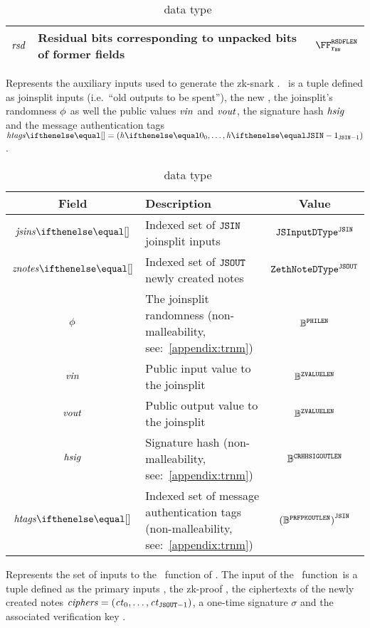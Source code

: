 \begin{description}
\begin{table}[H]
\begin{tabular}{cp{20em}c}
            $\mathit{rsd}$ & Residual bits corresponding to unpacked bits of former fields& $\FFx{\rBN}^{\resBitsFLen}$\\ \bottomrule
        \end{tabular}
        \caption{\primInputDType~data type}\label{zeth-protocol:tab:priminputs}
        \end{table}
    \item[\auxInputDType] Represents the auxiliary inputs used to generate the zk-snark \zkp. \auxinputs~is a tuple defined as \gls{joinsplit} inputs (i.e.~``old outputs to be spent''), the new \zethnotes{}, the joinsplit's randomness $\mathit{\phi}$ as well the public values $\mathit{vin}$ and $\mathit{vout}$, the signature hash $\mathit{hsig}$ and the message authentication tags $\htags{} = \smalltuple{\htag{0}, \ldots, \htag{\jsin-1}}$.
        \begin{table}[H]
        \centering
        \begin{tabular}{cp{20em}c}
            Field & Description & Value\\ \toprule
            $\jsins{}$ & Indexed set of $\mathtt{JSIN}$ \gls{joinsplit} inputs & ${\mathtt{JSInputDType}}^{\mathtt{JSIN}}$\\ \midrule
            $\znotes{}$ & Indexed set of $\mathtt{JSOUT}$ newly created notes & ${\mathtt{ZethNoteDType}}^{\mathtt{JSOUT}}$\\ \midrule
            $\mathit{\phi}$ & The \gls{joinsplit} randomness (non-malleability, see:~\cref{appendix:trnm}) & $\mathbb{B}^{\mathtt{PHILEN}}$\\ \midrule
            $\mathit{vin}$ & Public input value to the \gls{joinsplit} & $\mathbb{B}^{\mathtt{ZVALUELEN}}$\\ \midrule
            $\mathit{vout}$ & Public output value to the \gls{joinsplit} & $\mathbb{B}^{\mathtt{ZVALUELEN}}$\\ \midrule
            $\mathit{hsig}$ & Signature hash (non-malleability, see:~\cref{appendix:trnm}) & $\mathbb{B}^{\mathtt{CRHHSIGOUTLEN}}$\\ \midrule
            $\htags{}$ & Indexed set of message authentication tags (non-malleability, see:~\cref{appendix:trnm}) & ${(\mathbb{B}^{\mathtt{PRFPKOUTLEN}})}^{\mathtt{JSIN}}$\\ \bottomrule
        \end{tabular}
        \caption{\auxInputDType~data type}\label{zeth-protocol:tab:auxinputs}
        \end{table}
    \item[\mixInputDType] Represents the set of inputs to the \mix~function of \mixer. The input of the \mix~function~is a tuple defined as the primary inputs \priminputs, the zk-proof \zkp, the ciphertexts of the newly created notes $\mathit{ciphers} = ({\mathit{ct}_{0}, \ldots, \mathit{ct}_{\mathtt{JSOUT} - 1}})$, a one-time signature $\sigma$ and the associated verification key \vk.

\end{description}
